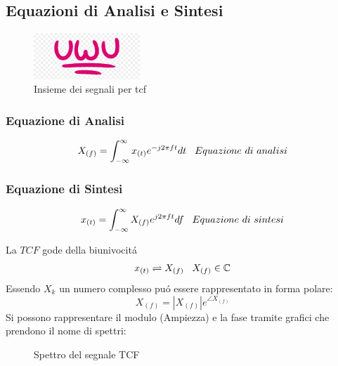     \subsection{Equazioni di Analisi e Sintesi}
        \begin{figure}[H]
            \centering
            \includegraphics[width=4cm]{media/uwu.png}
            \caption{Insieme dei segnali per tcf}
            \label{fig:segnali aperiodici tcf}
        \end{figure}
        {\subsubsection{Equazione di Analisi}
            \[X_{(f)} = \int_{-\infty}^{\infty} x_{(t)} e^{-j2\pi ft} dt\hspace{0.3cm} Equazione\ di\ analisi \]
            
        \subsubsection{Equazione di Sintesi}
            \[x_{(t)} = \int_{-\infty}^{\infty} X_{(f)} e^{j2\pi ft} df\hspace{0.3cm} Equazione\ di\ sintesi \]
        }
        La $TCF$ gode della biunivocitá
        \begin{align}
            x_{(t)} \rightleftharpoons  X_{(f)}\nonumber \hspace{0.3cm} X_{(f)} \in \mathbb{C}
        \end{align}
        Essendo $X_k$ un numero complesso puó essere rappresentato in forma polare: 
        \[
            X_{(f)} = |X_{(f)}|e^{\angle X_{(f)}}  
        \]
        Si possono rappresentare il modulo (Ampiezza) e la fase tramite grafici che prendono il nome di spettri:
        \begin{figure}[H]
            \centering
            \hfill
            \caption{Spettro del segnale TCF}
        \end{figure}

